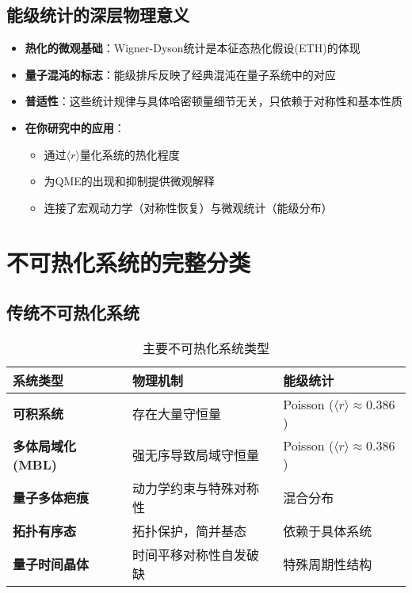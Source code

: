 \documentclass[11pt,a4paper]{article}
\begin{document}
\subsection{能级统计的深层物理意义}
\begin{itemize}
    \item \textbf{热化的微观基础}：Wigner-Dyson统计是本征态热化假设(ETH)的体现
    \item \textbf{量子混沌的标志}：能级排斥反映了经典混沌在量子系统中的对应
    \item \textbf{普适性}：这些统计规律与具体哈密顿量细节无关，只依赖于对称性和基本性质
    \item \textbf{在你研究中的应用}：
    \begin{itemize}
        \item 通过$\langle r \rangle$量化系统的热化程度
        \item 为QME的出现和抑制提供微观解释
        \item 连接了宏观动力学（对称性恢复）与微观统计（能级分布）
    \end{itemize}
\end{itemize}


\section{不可热化系统的完整分类}

\subsection{传统不可热化系统}

\begin{table}[H]
\centering
\caption{主要不可热化系统类型}
\begin{tabular}{|p{}|p{}|p{}|}
\hline
\textbf{系统类型} & \textbf{物理机制} & \textbf{能级统计} \\
\hline
\textbf{可积系统} & 存在大量守恒量 & Poisson ($\langle r \rangle \approx 0.386$) \\
\hline
\textbf{多体局域化(MBL)} & 强无序导致局域守恒量 & Poisson ($\langle r \rangle \approx 0.386$) \\
\hline
\textbf{量子多体疤痕} & 动力学约束与特殊对称性 & 混合分布 \\
\hline
\textbf{拓扑有序态} & 拓扑保护，简并基态 & 依赖于具体系统 \\
\hline
\textbf{量子时间晶体} & 时间平移对称性自发破缺 & 特殊周期性结构 \\
\hline
\end{tabular}
\end{table}
\end{document}
